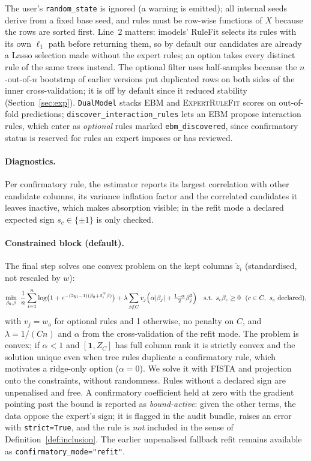 \documentclass[11pt,a4paper]{article}
\theoremstyle{definition}\newtheorem{definition}{Definition}
\begin{document}
The user's \texttt{random\_state} is ignored (a warning is emitted); all internal seeds derive from a fixed base seed, and rules must be row-wise functions of $X$ because the rows are sorted first. Line~2 matters: imodels' RuleFit selects its rules with its own $\ell_1$ path before returning them, so by default our candidates are already a Lasso selection made without the expert rules; an option takes every distinct rule of the same trees instead. The optional filter uses half-samples because the $n$-out-of-$n$ bootstrap of earlier versions put duplicated rows on both sides of the inner cross-validation; it is off by default since it reduced stability (Section~\ref{sec:exp}). \texttt{DualModel} stacks EBM and \textsc{ExpertRuleFit} scores on out-of-fold predictions; \texttt{discover\_interaction\_rules} lets an EBM propose interaction rules, which enter as \emph{optional} rules marked \texttt{ebm\_discovered}, since confirmatory status is reserved for rules an expert imposes or has reviewed.

\paragraph{Diagnostics.} Per confirmatory rule, the estimator reports its largest correlation with other candidate columns, its variance inflation factor and the correlated candidates it leaves inactive, which makes absorption visible; in the refit mode a declared expected sign $s_c\in\{\pm1\}$ is only checked.

\paragraph{Constrained block (default).} The final step solves one convex problem on the kept columns $\tilde z_i$ (standardised, not rescaled by $w$):
\[
\min_{\beta_0,\beta}\ \frac1n\sum_{i=1}^n \log\bigl(1+e^{-(2y_i-1)(\beta_0+\tilde z_i^\top\beta)}\bigr)+\lambda\sum_{j\notin C} v_j\Bigl(\alpha|\beta_j|+\tfrac{1-\alpha}{2}\beta_j^2\Bigr)
\quad\text{s.t. } s_c\beta_c\ge 0\ \ (c\in C,\ s_c\ \text{declared}),
\]
with $v_j=w_o$ for optional rules and 1 otherwise, no penalty on $C$, and $\lambda=1/(Cn)$ and $\alpha$ from the cross-validation of the refit mode. The problem is convex; if $\alpha<1$ and $[\mathbf 1, Z_C]$ has full column rank it is strictly convex and the solution unique even when tree rules duplicate a confirmatory rule, which motivates a ridge-only option ($\alpha=0$). We solve it with FISTA and projection onto the constraints, without randomness. Rules without a declared sign are unpenalised and free. A confirmatory coefficient held at zero with the gradient pointing past the bound is reported as \emph{bound-active}: given the other terms, the data oppose the expert's sign; it is flagged in the audit bundle, raises an error with \texttt{strict=True}, and the rule is \emph{not} included in the sense of Definition~\ref{def:inclusion}. The earlier unpenalised fallback refit remains available as \texttt{confirmatory\_mode="refit"}.
\end{document}
